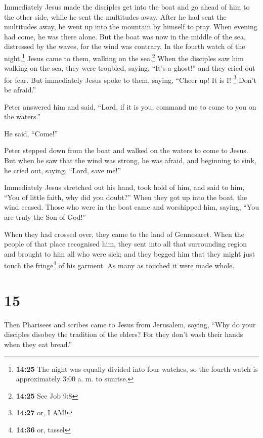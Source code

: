  Immediately Jesus made the disciples get into the boat
and go ahead of him to the other side, while he sent the multitudes
away.  After he had sent the multitudes away, he went up
into the mountain by himself to pray. When evening had come, he was
there alone.  But the boat was now in the middle of the
sea, distressed by the waves, for the wind was contrary. 
In the fourth watch of the night,\footnote{\textbf{14:25} The night was
  equally divided into four watches, so the fourth watch is
  approximately 3:00 a. m. to sunrise.} Jesus came to them, walking on
the sea.\footnote{\textbf{14:25} See Job 9:8}  When the
disciples saw him walking on the sea, they were troubled, saying, ``It's
a ghost!'' and they cried out for fear.  But immediately
Jesus spoke to them, saying, ``Cheer up! It is I! \footnote{\textbf{14:27}
  or, I AM!} Don't be afraid.''

 Peter answered him and said, ``Lord, if it is you,
command me to come to you on the waters.''

 He said, ``Come!''

Peter stepped down from the boat and walked on the waters to come to
Jesus.  But when he saw that the wind was strong, he was
afraid, and beginning to sink, he cried out, saying, ``Lord, save me!''

 Immediately Jesus stretched out his hand, took hold of
him, and said to him, ``You of little faith, why did you doubt?''
 When they got up into the boat, the wind ceased.
 Those who were in the boat came and worshipped him,
saying, ``You are truly the Son of God!''

 When they had crossed over, they came to the land of
Gennesaret.  When the people of that place recognised
him, they sent into all that surrounding region and brought to him all
who were sick;  and they begged him that they might just
touch the fringe\footnote{\textbf{14:36} or, tassel} of his garment. As
many as touched it were made whole.

\hypertarget{section-14}{%
\section{15}\label{section-14}}

 Then Pharisees and scribes came to Jesus from Jerusalem,
saying,  ``Why do your disciples disobey the tradition of
the elders? For they don't wash their hands when they eat bread.''


